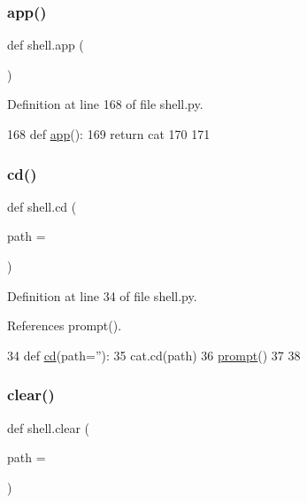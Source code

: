 \subsubsection{\texorpdfstring{app()}{app()}}
{\footnotesize\ttfamily def shell.\+app (\begin{DoxyParamCaption}{ }\end{DoxyParamCaption})}



Definition at line 168 of file shell.\+py.


\begin{DoxyCode}
168 \textcolor{keyword}{def }\hyperlink{namespaceshell_a79f68caaf52d03ff793360cebe45cc22}{app}():
169   \textcolor{keywordflow}{return} cat
170 
171 
\end{DoxyCode}
\mbox{\label{namespaceshell_a407fefdfad7caab50f7b0eabd9ddbf55}} 
\subsubsection{\texorpdfstring{cd()}{cd()}}
{\footnotesize\ttfamily def shell.\+cd (\begin{DoxyParamCaption}\item[{}]{path = {\ttfamily \textquotesingle{}\textquotesingle{}} }\end{DoxyParamCaption})}



Definition at line 34 of file shell.\+py.



References prompt().


\begin{DoxyCode}
34 \textcolor{keyword}{def }\hyperlink{namespaceshell_a407fefdfad7caab50f7b0eabd9ddbf55}{cd}(path=''):
35   cat.cd(path)
36   \hyperlink{namespaceshell_af141a2fee68e5e84d8ac2cc51c3feedd}{prompt}()
37 
38 
\end{DoxyCode}
\mbox{\label{namespaceshell_a14da1173b3cc5b8569cc0020130e3bd7}} 
\subsubsection{\texorpdfstring{clear()}{clear()}}
{\footnotesize\ttfamily def shell.\+clear (\begin{DoxyParamCaption}\item[{}]{path = {\ttfamily \textquotesingle{}\textquotesingle{}} }\end{DoxyParamCaption})}



